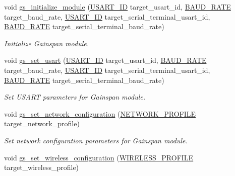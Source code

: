 \begin{DoxyCompactItemize}
void \hyperlink{group__wireless__interface_gadd81da265cd8d3519ec4ac9759064849}{gs\+\_\+initialize\+\_\+module} (\hyperlink{group__usart_async_module_gaae3c5ea77a411e5f40e4377f77067b86}{U\+S\+A\+R\+T\+\_\+\+ID} target\+\_\+usart\+\_\+id, \hyperlink{group__wireless__interface_gafd83f18bb43add6a2eaf3228fec2fed7}{B\+A\+U\+D\+\_\+\+R\+A\+TE} target\+\_\+baud\+\_\+rate, \hyperlink{group__usart_async_module_gaae3c5ea77a411e5f40e4377f77067b86}{U\+S\+A\+R\+T\+\_\+\+ID} target\+\_\+serial\+\_\+terminal\+\_\+usart\+\_\+id, \hyperlink{group__wireless__interface_gafd83f18bb43add6a2eaf3228fec2fed7}{B\+A\+U\+D\+\_\+\+R\+A\+TE} target\+\_\+serial\+\_\+terminal\+\_\+baud\+\_\+rate)
\begin{DoxyCompactList}\small\item\em Initialize Gainspan module. \end{DoxyCompactList}\item 
void \hyperlink{group__wireless__interface_ga0137ec7b150b3a5b08c21d5ca5294891}{gs\+\_\+set\+\_\+usart} (\hyperlink{group__usart_async_module_gaae3c5ea77a411e5f40e4377f77067b86}{U\+S\+A\+R\+T\+\_\+\+ID} target\+\_\+usart\+\_\+id, \hyperlink{group__wireless__interface_gafd83f18bb43add6a2eaf3228fec2fed7}{B\+A\+U\+D\+\_\+\+R\+A\+TE} target\+\_\+baud\+\_\+rate, \hyperlink{group__usart_async_module_gaae3c5ea77a411e5f40e4377f77067b86}{U\+S\+A\+R\+T\+\_\+\+ID} target\+\_\+serial\+\_\+terminal\+\_\+usart\+\_\+id, \hyperlink{group__wireless__interface_gafd83f18bb43add6a2eaf3228fec2fed7}{B\+A\+U\+D\+\_\+\+R\+A\+TE} target\+\_\+serial\+\_\+terminal\+\_\+baud\+\_\+rate)
\begin{DoxyCompactList}\small\item\em Set U\+S\+A\+RT parameters for Gainspan module. \end{DoxyCompactList}\item 
void \hyperlink{group__wireless__interface_ga9d2e2414919271a9031b843a6c9c7cea}{gs\+\_\+set\+\_\+network\+\_\+configuration} (\hyperlink{group__wireless__interface_struct_n_e_t_w_o_r_k___p_r_o_f_i_l_e}{N\+E\+T\+W\+O\+R\+K\+\_\+\+P\+R\+O\+F\+I\+LE} target\+\_\+network\+\_\+profile)
\begin{DoxyCompactList}\small\item\em Set network configuration parameters for Gainspan module. \end{DoxyCompactList}\item 
void \hyperlink{group__wireless__interface_ga1a44d81b83d52c48266bb00597a38429}{gs\+\_\+set\+\_\+wireless\+\_\+configuration} (\hyperlink{group__wireless__interface_struct_w_i_r_e_l_e_s_s___p_r_o_f_i_l_e}{W\+I\+R\+E\+L\+E\+S\+S\+\_\+\+P\+R\+O\+F\+I\+LE} target\+\_\+wireless\+\_\+profile)

\end{DoxyCompactItemize}
